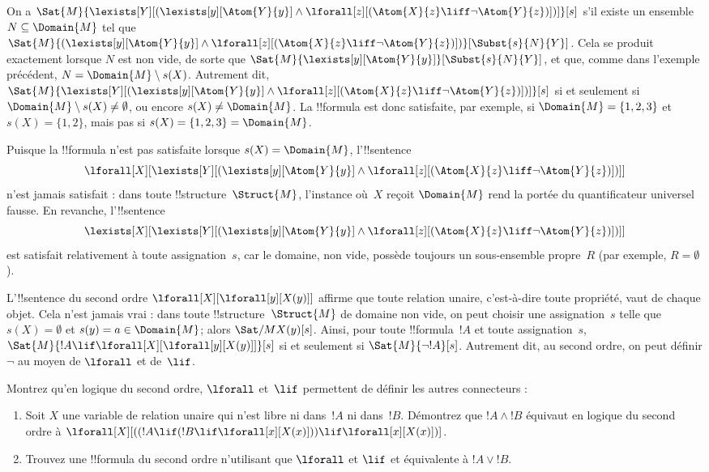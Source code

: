 \documentclass[../../../include/open-logic-section]{subfiles}
\begin{document}
\begin{ex}
On a
$\Sat{M}{\lexists[Y][(\lexists[y][\Atom{Y}{y}]
\land\lforall[z][(\Atom{X}{z}\liff
\lnot\Atom{Y}{z})])]}[s]$
s'il existe un ensemble $N\subseteq\Domain{M}$
tel que
$\Sat{M}{(\lexists[y][\Atom{Y}{y}]
\land\lforall[z][(\Atom{X}{z}\liff
\lnot\Atom{Y}{z})])}[\Subst{s}{N}{Y}]$.
Cela se produit exactement lorsque $N$ est non
vide, de sorte que
$\Sat{M}{\lexists[y][\Atom{Y}{y}]}
[\Subst{s}{N}{Y}]$, et que, comme dans l'exemple
précédent, $N=\Domain{M}\setminus s(X)$.
Autrement dit,
$\Sat{M}{\lexists[Y][(\lexists[y][\Atom{Y}{y}]
\land\lforall[z][(\Atom{X}{z}\liff
\lnot\Atom{Y}{z})])]}[s]$
si et seulement si
$\Domain{M}\setminus s(X)\neq\emptyset$,
ou encore $s(X)\neq\Domain{M}$.
La !!{formula} est donc satisfaite, par exemple,
si $\Domain{M}=\{1,2,3\}$ et
$s(X)=\{1,2\}$, mais pas si
$s(X)=\{1,2,3\}=\Domain{M}$.

Puisque la !!{formula} n'est pas satisfaite lorsque
$s(X)=\Domain{M}$, l'!!{sentence}
\[
\lforall[X][\lexists[Y][(\lexists[y][\Atom{Y}{y}]
\land\lforall[z][(\Atom{X}{z}\liff
\lnot\Atom{Y}{z})])]]
\]
n'est jamais satisfait : dans toute
!!{structure}~$\Struct{M}$, l'instance où~$X$
reçoit $\Domain{M}$ rend la portée du quantificateur
universel fausse. En revanche, l'!!{sentence}
\[
\lexists[X][\lexists[Y][(\lexists[y][\Atom{Y}{y}]
\land\lforall[z][(\Atom{X}{z}\liff
\lnot\Atom{Y}{z})])]]
\]
est satisfait relativement à toute
assignation~$s$, car le domaine, non vide, possède
toujours un sous-ensemble propre~$R$
(par exemple, $R=\emptyset$).
\end{ex}

\begin{ex}
L'!!{sentence} du second ordre
$\lforall[X][\lforall[y][X(y)]]$ affirme que
toute relation unaire, c'est-à-dire toute propriété,
vaut de chaque objet. Cela n'est jamais vrai :
dans toute !!{structure}~$\Struct{M}$ de domaine
non vide, on peut choisir une assignation~$s$
telle que $s(X)=\emptyset$ et
$s(y)=a\in\Domain{M}$; alors
$\Sat/{M}{X(y)}[s]$.
Ainsi, pour toute !!{formula}~$!A$ et toute
assignation~$s$,
$\Sat{M}{!A\lif
\lforall[X][\lforall[y][X(y)]]}[s]$
si et seulement si $\Sat{M}{\lnot !A}[s]$.
Autrement dit, au second ordre, on peut définir
$\lnot$ au moyen de $\lforall$ et de~$\lif$.
\end{ex}

\begin{prob}
Montrez qu'en logique du second ordre,
$\lforall$ et~$\lif$ permettent de définir
les autres connecteurs :
\begin{enumerate}
\item Soit $X$ une variable de relation unaire qui n'est libre ni dans~$!A$ ni dans~$!B$. Démontrez que
  $!A\land !B$ équivaut en logique du second ordre à
  $\lforall[X][((!A\lif
  (!B\lif\lforall[x][X(x)]))\lif
  \lforall[x][X(x)])]$.
\item Trouvez une !!{formula} du second ordre
  n'utilisant que $\lforall$ et $\lif$ et
  équivalente à $!A\lor !B$.
\end{enumerate}
\end{prob}
\end{document}

